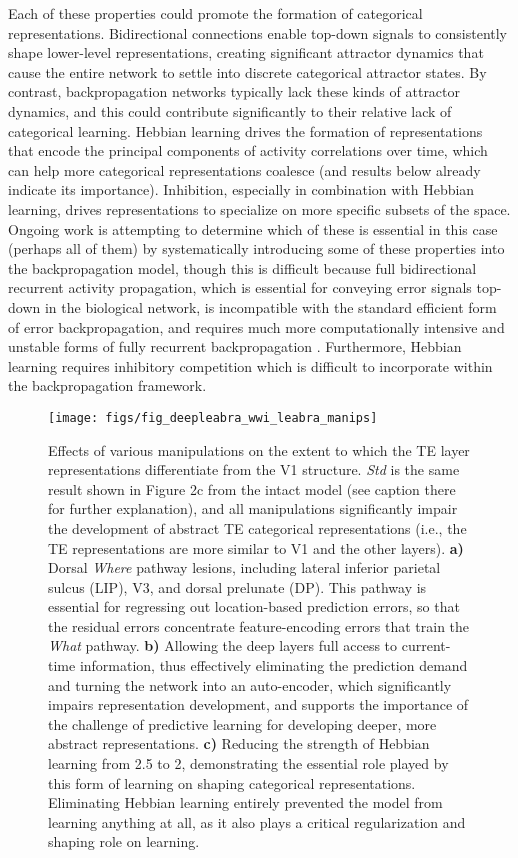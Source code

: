 \documentclass[12pt,twoside]{article}
\newif\myifpdf
\begin{document}
Each of these properties could promote the formation of categorical representations. Bidirectional connections enable top-down signals to consistently shape lower-level representations, creating significant attractor dynamics that cause the entire network to settle into discrete categorical attractor states. By contrast, backpropagation networks typically lack these kinds of attractor dynamics, and this could contribute significantly to their relative lack of categorical learning.  Hebbian learning drives the formation of representations that encode the principal components of activity correlations over time, which can help more categorical representations coalesce (and results below already indicate its importance).  Inhibition, especially in combination with Hebbian learning, drives representations to specialize on more specific subsets of the space.  Ongoing work is attempting to determine which of these is essential in this case (perhaps all of them) by systematically introducing some of these properties into the backpropagation model, though this is difficult because full bidirectional recurrent activity propagation, which is essential for conveying error signals top-down in the biological network, is incompatible with the standard efficient form of error backpropagation, and requires much more computationally intensive and unstable forms of fully recurrent backpropagation \cite{WilliamsZipser92,Pineda87}.  Furthermore, Hebbian learning requires inhibitory competition which is difficult to incorporate within the backpropagation framework.

\begin{figure}
  \centering\texttt{[image: figs/fig\_deepleabra\_wwi\_leabra\_manips]}
  \caption{\small Effects of various manipulations on the extent to which the TE layer representations differentiate from the V1 structure.  {\em Std} is the same result shown in Figure 2c from the intact model (see caption there for further explanation), and all manipulations significantly impair the development of abstract TE categorical representations (i.e., the TE representations are more similar to V1 and the other layers).  {\bf a)} Dorsal {\em Where} pathway lesions, including lateral inferior parietal sulcus (LIP), V3, and dorsal prelunate (DP).  This pathway is essential for regressing out location-based prediction errors, so that the residual errors concentrate feature-encoding errors that train the {\em What} pathway.  {\bf b)} Allowing the deep layers full access to current-time information, thus effectively eliminating the prediction demand and turning the network into an auto-encoder, which significantly impairs representation development, and supports the importance of the challenge of predictive learning for developing deeper, more abstract representations.  {\bf c)} Reducing the strength of Hebbian learning from 2.5 to 2, demonstrating the essential role played by this form of learning on shaping categorical representations.  Eliminating Hebbian learning entirely prevented the model from learning anything at all, as it also plays a critical regularization and shaping role on learning.}
  \label{fig.manips}
\end{figure}
\end{document}
